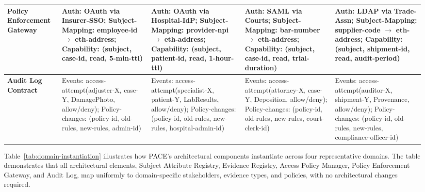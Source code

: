 \documentclass[pdflatex,sn-mathphys-num]{sn-jnl}
\begin{document}
\begin{table}[!htbp]
\begin{tabularx}{\textwidth}{@{}p{1.5cm}
>{\raggedright\arraybackslash}X
>{\raggedright\arraybackslash}X
>{\raggedright\arraybackslash}X
>{\raggedright\arraybackslash}X@{}}
\textbf{Policy Enforcement Gateway}
&
Auth: OAuth via Insurer-SSO; Subject-Mapping: employee-id $\rightarrow$ eth-address; Capability: (subject, case-id, read, 5-min-ttl)
&
Auth: OAuth via Hospital-IdP; Subject-Mapping: provider-npi $\rightarrow$ eth-address; Capability: (subject, patient-id, read, 1-hour-ttl)
&
Auth: SAML via Courts; Subject-Mapping: bar-number $\rightarrow$ eth-address; Capability: (subject, case-id, read, trial-duration)
&
Auth: LDAP via Trade-Assn; Subject-Mapping: supplier-code $\rightarrow$ eth-address; Capability: (subject, shipment-id, read, audit-period)
\\
\midrule

\textbf{Audit Log Contract}
&
Events: access-attempt(adjuster-X, case-Y, DamagePhoto, allow/deny); Policy-changes: (policy-id, old-rules, new-rules, admin-id)
&
Events: access-attempt(specialist-X, patient-Y, LabResults, allow/deny); Policy-changes: (policy-id, old-rules, new-rules, hospital-admin-id)
&
Events: access-attempt(attorney-X, case-Y, Deposition, allow/deny); Policy-changes: (policy-id, old-rules, new-rules, court-clerk-id)
&
Events: access-attempt(auditor-X, shipment-Y, Provenance, allow/deny); Policy-changes: (policy-id, old-rules, new-rules, compliance-officer-id)
\\

\bottomrule
\end{tabularx}
\endgroup
\end{table}
Table~\ref{tab:domain-instantiation} illustrates how PACE's architectural components instantiate across four representative domains. The table demonstrates that all architectural elements, Subject Attribute Registry, Evidence Registry, Access Policy Manager, Policy Enforcement Gateway, and Audit Log, map uniformly to domain-specific stakeholders, evidence types, and policies, with no architectural changes required.
\end{document}

